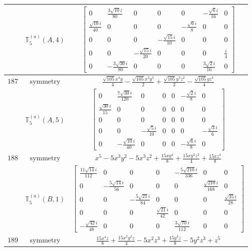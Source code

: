 \documentclass[fleqn,8pt,landscape]{jsarticle}
\begin{document}
\begin{longtable}{ccc}
$  $ & $ \mathbb{T}_{5}^{(a)}(A,4) $ & $ \begin{bmatrix} 0 & \frac{3 \sqrt{10} i}{80} & 0 & 0 & 0 & - \frac{\sqrt{6} i}{16} & 0 \\ \frac{\sqrt{10} i}{40} & 0 & 0 & 0 & - \frac{\sqrt{6} i}{8} & 0 & 0 \\ 0 & 0 & 0 & - \frac{\sqrt{15} i}{10} & 0 & 0 & 0 \\ 0 & 0 & - \frac{\sqrt{15} i}{20} & 0 & 0 & 0 & \frac{i}{4} \\ 0 & - \frac{3 \sqrt{30} i}{80} & 0 & 0 & 0 & \frac{3 \sqrt{2} i}{16} & 0 \end{bmatrix} $ \\ \hline
$ 187 $ & $ \text{symmetry} $ & $ \frac{\sqrt{105} x^{4} y}{4} - \frac{\sqrt{105} x^{2} y^{3}}{2} + \frac{\sqrt{105} y^{3} z^{2}}{2} - \frac{\sqrt{105} y z^{4}}{4} $ \\
$  $ & $ \mathbb{T}_{5}^{(a)}(A,5) $ & $ \begin{bmatrix} 0 & \frac{7 \sqrt{30} i}{120} & 0 & 0 & 0 & - \frac{\sqrt{2} i}{8} & 0 \\ \frac{\sqrt{30} i}{15} & 0 & 0 & 0 & 0 & 0 & 0 \\ 0 & 0 & 0 & 0 & 0 & 0 & 0 \\ 0 & 0 & - \frac{\sqrt{5} i}{10} & 0 & 0 & 0 & - \frac{\sqrt{3} i}{6} \\ 0 & - \frac{\sqrt{10} i}{40} & 0 & 0 & 0 & - \frac{\sqrt{6} i}{8} & 0 \end{bmatrix} $ \\ \hline
$ 188 $ & $ \text{symmetry} $ & $ x^{5} - 5 x^{3} y^{2} - 5 x^{3} z^{2} + \frac{15 x y^{4}}{8} + \frac{15 x y^{2} z^{2}}{4} + \frac{15 x z^{4}}{8} $ \\
$  $ & $ \mathbb{T}_{5}^{(a)}(B,1) $ & $ \begin{bmatrix} \frac{11 \sqrt{14} i}{112} & 0 & 0 & 0 & - \frac{5 \sqrt{210} i}{336} & 0 & 0 \\ 0 & - \frac{5 \sqrt{14} i}{56} & 0 & 0 & 0 & \frac{\sqrt{210} i}{168} & 0 \\ 0 & 0 & - \frac{5 \sqrt{21} i}{84} & 0 & 0 & 0 & \frac{\sqrt{35} i}{28} \\ 0 & 0 & 0 & \frac{\sqrt{21} i}{42} & 0 & 0 & 0 \\ - \frac{\sqrt{42} i}{48} & 0 & 0 & 0 & \frac{3 \sqrt{70} i}{112} & 0 & 0 \end{bmatrix} $ \\ \hline
$ 189 $ & $ \text{symmetry} $ & $ \frac{15 x^{4} z}{8} + \frac{15 x^{2} y^{2} z}{4} - 5 x^{2} z^{3} + \frac{15 y^{4} z}{8} - 5 y^{2} z^{3} + z^{5} $ \\

\end{longtable}
\end{document}
